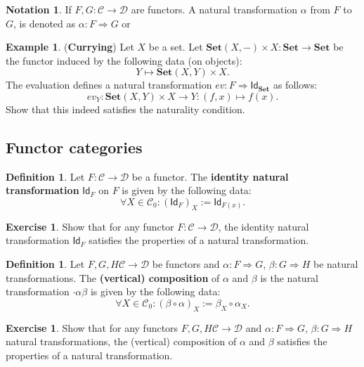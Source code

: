 \documentclass[a4paper,10pt]{scrartcl}
\theoremstyle{plain}
\theoremstyle{definition}
\newtheorem{dfn}[thm]{Definition}
\newtheorem{exa}[thm]{Example}
\newtheorem{exer}[thm]{Exercise}
\newtheorem{nota}[thm]{Notation}
\newcommand{\cfont}[1]{\ensuremath{\mathsf{#1}}}
\newcommand{\Cat}[1]{\mathcal{#1}}
\newcommand{\CC}{\Cat{C}}
\newcommand{\DD}{\Cat{D}}
\newcommand{\Catb}[1]{\mathbf{#1}}
\newcommand{\SET}{\Catb{Set}}
\newcommand{\Ob}[1]{{#1}_0}
\newcommand{\Id}[1][]{\cfont{Id}_{#1}}
\newcommand{\Comp}{\cdot}
\newcommand{\NatTrans}[3]{#1 : #2 \Rightarrow #3}
\newcommand{\co}[2]{\ensuremath{#2 \circ #1}}
\begin{document}
\begin{nota} If $F,G:\CC\to\DD$ are functors. A natural transformation $\alpha$ from $F$ to $G$, is denoted as $\NatTrans{\alpha}{F}{G}$ or 
\begin{center}
\end{center}
\end{nota}

\begin{exa} (\textbf{Currying}) Let $X$ be a set. Let $\SET(X, -)\times X : \SET\to\SET$ be the functor induced by the following data (on objects):
\[
Y\mapsto \SET(X,Y)\times X.
\]
The evaluation defines a natural transformation $\NatTrans{ev}{F}{\Id[\SET]}$ as follows:
\[
ev_Y : \SET(X,Y) \times X \to Y : (f,x) \mapsto f(x).
\]
Show that this indeed satisfies the naturality condition.
\end{exa}

\subsection{Functor categories}
\begin{dfn}\label{dfn:nattrans_id} Let $F:\CC\to\DD$ be a functor. The \textbf{identity natural transformation} $\Id[F]$ on $F$ is given by the following data:
\[
\forall X\in\Ob{\CC}: (\Id[F])_{X} := \Id[F(x)].
\]
\end{dfn}

\begin{exer} Show that for any functor $F:\CC\to\DD$, the identity natural transformation $\Id[F]$ satisfies the properties of a natural transformation.
\end{exer}

\begin{dfn}\label{dfn:nattrans_comp} Let $F,G,H\CC\to\DD$ be functors and $\NatTrans{\alpha}{F}{G}$, $\NatTrans{\beta}{G}{H}$ be natural transformations. The \textbf{(vertical) composition} of $\alpha$ and $\beta$ is the natural transformation $\Comp{\alpha}{\beta}$ is given by the following data:
\[
\forall X\in\Ob{\CC}: (\co{\alpha}{\beta})_{X} := \co{\alpha_X}{\beta_X}.
\]
\end{dfn}

\begin{exer} Show that for any functors $F,G,H\CC\to\DD$ and $\NatTrans{\alpha}{F}{G}$, $\NatTrans{\beta}{G}{H}$ natural transformations, the (vertical) composition of $\alpha$ and $\beta$ satisfies the properties of a natural transformation.
\end{exer}
\end{document}
